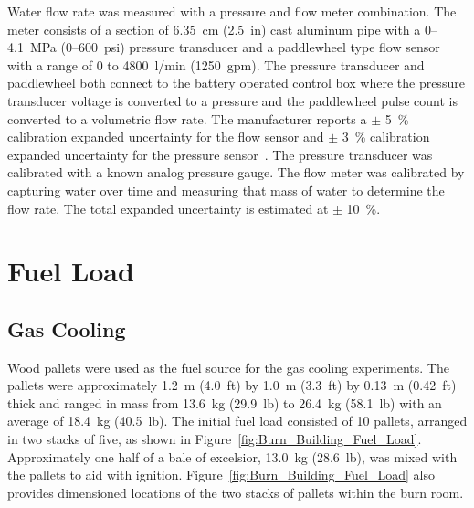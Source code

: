 \documentclass[12pt,oneside]{book}
\begin{document}
Water flow rate was measured with a pressure and flow meter combination. The meter consists of a section of 6.35~cm (2.5~in) cast aluminum pipe with a 0--4.1~MPa (0--600~psi) pressure transducer and a paddlewheel type flow sensor with a range of 0 to 4800~l/min (1250~gpm). The pressure transducer and paddlewheel both connect to the battery operated control box where the pressure transducer voltage is converted to a pressure and the paddlewheel pulse count is converted to a volumetric flow rate.  The manufacturer reports a $\pm$ 5~\% calibration expanded uncertainty for the flow sensor and $\pm$ 3~\% calibration expanded uncertainty for the pressure sensor~\cite{Akron:2009}. The pressure transducer was calibrated with a known analog pressure gauge. The flow meter was calibrated by capturing water over time and measuring that mass of water to determine the flow rate. The total expanded uncertainty is estimated at $\pm$ 10~\%.

\section{Fuel Load}
\label{sec:fuel_load}

\subsection{Gas Cooling}
\label{sec:Fuel_Load_Gas_Cooling}

Wood pallets were used as the fuel source for the gas cooling experiments. The pallets were approximately 1.2~m (4.0~ft) by 1.0~m (3.3~ft) by 0.13~m (0.42~ft) thick and ranged in mass from 13.6~kg (29.9~lb) to 26.4~kg (58.1~lb) with an average of 18.4~kg (40.5~lb). The initial fuel load consisted of 10 pallets, arranged in two stacks of five, as shown in Figure~\ref{fig:Burn_Building_Fuel_Load}. Approximately one half of a bale of excelsior, 13.0~kg (28.6~lb), was mixed with the pallets to aid with ignition. Figure~\ref{fig:Burn_Building_Fuel_Load} also provides dimensioned locations of the two stacks of pallets within the burn room.
\end{document}
